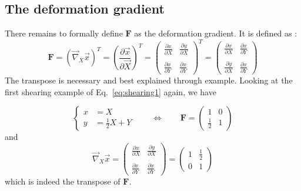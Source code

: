 \newpage
\subsection*{The deformation gradient}

There remains to formally define ${\bm F}$ as the deformation gradient.
It is defined as :
\[
\boxed{
{\bm F} = (\vec\nabla_X \vec{x})^T
= 
\left(\frac{\partial \vec{x}}{\partial \vec{X}} \right)^T
=
\left(
\begin{array}{cc}
\frac{\partial x}{\partial X} & 
\frac{\partial y}{\partial X} \\ \\
\frac{\partial x}{\partial Y} & 
\frac{\partial x}{\partial Y}  
\end{array}
\right)^T
=
\left(
\begin{array}{cc}
\frac{\partial x}{\partial X} & 
\frac{\partial x}{\partial Y} \\ \\
\frac{\partial y}{\partial X} & 
\frac{\partial x}{\partial Y}  
\end{array}
\right)
}
\]
The transpose is necessary and best explained through example. 
Looking at the first shearing example of Eq.~\eqref{eq:shearing1} again, we have

\begin{equation}
\begin{cases} 
x &=X  \\ 
y &=\frac12 X + Y 
\end{cases}
\qquad
\Leftrightarrow
\qquad
{\bm F} = 
\left(
\begin{array}{cc}
1 & 0 \\
\frac12 & 1
\end{array}
\right)
\label{eq:shearing2}
\end{equation}
and 
\[
\vec\nabla_{X}  \vec{x}=
\left(
\begin{array}{cc}
\frac{\partial x}{\partial X} & 
\frac{\partial y}{\partial X} \\ \\
\frac{\partial x}{\partial Y} & 
\frac{\partial x}{\partial Y}  
\end{array}
\right)
=
\left(
\begin{array}{cc}
1 & \frac12 \\ 
0 & 1
\end{array}
\right)
\]
which is indeed the transpose of ${\bm F}$.


